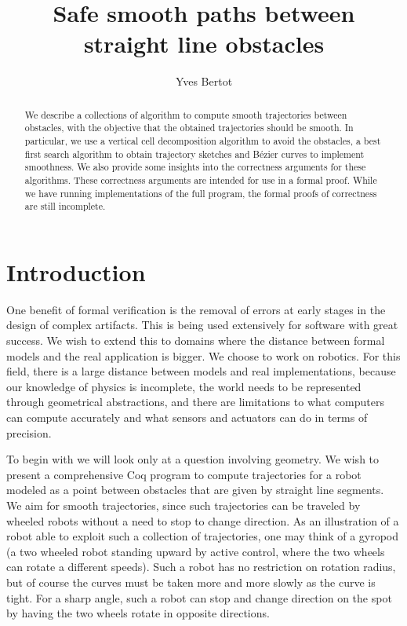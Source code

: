 \documentclass{llncs}
\title{Safe smooth paths between straight line obstacles}
\author{Yves Bertot
\orcidID{0000-0001-5052-3019}}
\institute{Inria Université Côte d'Azur\\
\email{yves.bertot@inria.fr}}
\begin{document}
\maketitle
\begin{abstract}
We describe a collections of algorithm to compute smooth trajectories between
obstacles, with the objective that the obtained trajectories should be
smooth.  In particular, we use a vertical cell decomposition algorithm
to avoid the obstacles, a best first search algorithm to obtain
trajectory sketches and Bézier curves to implement smoothness.  We also
provide some insights into the correctness arguments for these
algorithms.  These correctness arguments are intended for use in a
formal proof.  While we have running implementations of the full
program, the formal proofs of correctness are still incomplete.
\end{abstract}
\section{Introduction}
One benefit of formal verification is the removal of errors at early
stages in the design of complex artifacts.  This is being used
extensively for software with great success.  We wish to extend this
to domains where the distance between formal models and the real
application is bigger.  We choose to work on robotics.  For this
field, there is a large distance between models and real
implementations, because our knowledge of physics is incomplete, the
world needs to be represented through geometrical abstractions, and
there are limitations to what computers can compute accurately and
what sensors and actuators can do in terms of precision.

To begin with we will look only at a question involving geometry.  We
wish to present a comprehensive Coq program to compute trajectories
for a robot modeled as a point between obstacles that are given by
straight line segments.  We aim for smooth trajectories, since such
trajectories can be traveled by wheeled robots without a need to stop to
change direction.    As an illustration of a robot able to exploit
such a collection of trajectories, one may think of a gyropod (a
two wheeled robot standing upward by active control, where the two
wheels can rotate a different speeds).  Such a robot has no
restriction on rotation radius, but of course the curves must be taken
more and more slowly as the curve is tight.  For a sharp angle, such a
robot can stop and change direction on the spot by having the two
wheels rotate in opposite directions.
\end{document}
